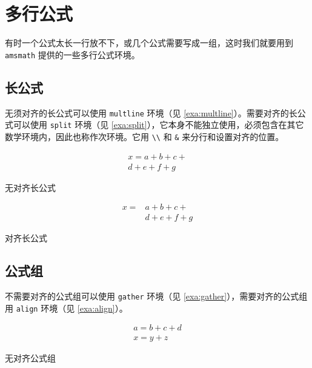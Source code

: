 \section{多行公式}

有时一个公式太长一行放不下，或几个公式需要写成一组，这时我们就要用到\texttt{amsmath} 提供的一些多行公式环境。

\subsection{长公式}
\label{sec:longeq}

无须对齐的长公式可以使用 \texttt{multline} 环境（见 \autoref{exa:multline}）。需要对齐的长公式可以使用 \texttt{split} 环境（见 \autoref{exa:split}），它本身不能独立使用，必须包含在其它数学环境内，因此也称作次环境。它用 \verb|\\| 和 \verb|&| 来分行和设置对齐的位置。

\begin{example}[htbp]
\begin{RLDemo}[]
\begin{multline}
x = a+b+c+{} \\
  d+e+f+g
\end{multline}
\end{RLDemo}
\caption{无对齐长公式}
\label{exa:multline}
\end{example}

\begin{example}[htbp]
\begin{RLDemo}[]
\[ \begin{split}
x ={} &a+b+c+{} \\
      &d+e+f+g
\end{split} \]
\end{RLDemo}
\caption{对齐长公式}
\label{exa:split}
\end{example}

\subsection{公式组}

不需要对齐的公式组可以使用 \texttt{gather} 环境（见 \autoref{exa:gather}），需要对齐的公式组用 \texttt{align} 环境（见 \autoref{exa:align}）。

\begin{example}[htbp]
\begin{RLDemo}[]
\begin{gather}
a = b+c+d \\
x = y+z
\end{gather}
\end{RLDemo}
\caption{无对齐公式组}
\label{exa:gather}
\end{example}

